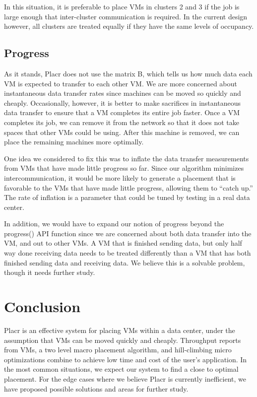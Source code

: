 \documentclass[11pt]{article}
\begin{document}
 In this situation, it is preferable to place VMs in clusters 2 and 3 if the job is large enough that inter-cluster communication is required.  In the current design however, all clusters are treated equally if they have the same levels of occupancy.
 
\subsection{Progress}

As it stands, Placr does not use the matrix B, which tells us how much data each VM is expected to transfer to each other VM. We are more concerned about instantaneous data transfer rates since machines can be moved so quickly and cheaply.  Occasionally, however, it is better to make sacrifices in instantaneous data transfer to ensure that a VM completes its entire job faster.  Once a VM completes its job, we can remove it from the network so that it does not take spaces that other VMs could be using.  After this machine is removed, we can place the remaining machines more optimally.

One idea we considered to fix this was to inflate the data transfer measurements from VMs that have made little progress so far.  Since our algorithm minimizes intercommunication, it would be more likely to generate a placement that is favorable to the VMs that have made little progress, allowing them to ``catch up.''  The rate of inflation is a parameter that could be tuned by testing in a real data center.

In addition, we would have to expand our notion of progress beyond the progress() API function since we are concerned about both data transfer into the VM, and out to other VMs.  A VM that is finished sending data, but only half way done receiving data needs to be treated differently than a VM that has both finished sending data and receiving data.  We believe this is a solvable problem, though it needs further study.

\section{Conclusion}

Placr is an effective system for placing VMs within a data center, under the assumption that VMs can be moved quickly and cheaply.  Throughput reports from VMs, a two level macro placement algorithm, and hill-climbing micro optimizations combine to achieve low time and cost of the user's application.  In the most common situations, we expect our system to find a close to optimal placement. For the edge cases where we believe Placr is currently inefficient, we have proposed possible solutions and areas for further study.
\end{document}

